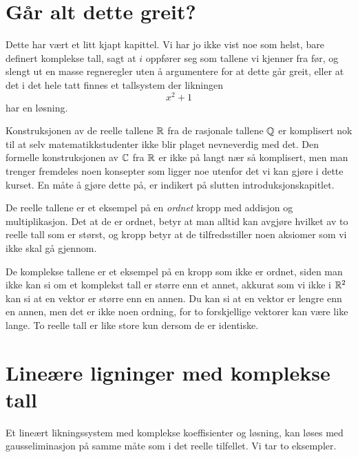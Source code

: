 \section*{Går alt dette greit?}
Dette har vært et litt kjapt kapittel. 
Vi har jo ikke vist noe som helst, bare definert komplekse tall, sagt at $i$ oppfører seg som tallene vi kjenner fra før, 
og slengt ut en masse regneregler uten å argumentere for at dette går greit, 
eller at det i det hele tatt finnes et tallsystem der likningen
\[
x^2+1
\]
har en løsning. 

Konstruksjonen av de reelle tallene $\mathbb{R}$ fra de rasjonale tallene $\mathbb{Q}$ er komplisert nok til at selv matematikkstudenter ikke blir plaget nevneverdig med det. 
Den formelle konstruksjonen av $\mathbb{C}$ fra $\mathbb{R}$ er ikke på langt nær så komplisert, 
men man trenger fremdeles noen konsepter som ligger noe utenfor det vi kan gjøre i dette kurset.
En måte å gjøre dette på, er indikert på slutten introduksjonskapitlet. 

De reelle tallene er et eksempel på en \emph{ordnet} kropp med addisjon og multiplikasjon. 
Det at de er ordnet, betyr at man alltid kan avgjøre hvilket av to reelle tall som er størst, 
og kropp betyr at de tilfredsstiller noen aksiomer som vi ikke skal gå gjennom.

De komplekse tallene er et eksempel på en kropp som ikke er ordnet, 
siden man ikke kan si om et komplekst tall er større enn et annet, 
akkurat som vi ikke i $\mathbb{R}^2$ kan si at en vektor er større enn en annen. 
Du kan si at en vektor er lengre enn en annen, men det er ikke noen ordning, 
for to forskjellige vektorer kan være like lange. 
To reelle tall er like store kun dersom de er identiske.

\section*{Lineære ligninger med komplekse tall}

Et lineært likningssystem med komplekse koeffisienter og løsning, 
kan løses med gausseliminasjon på samme måte som i det reelle tilfellet.
Vi tar to eksempler.

